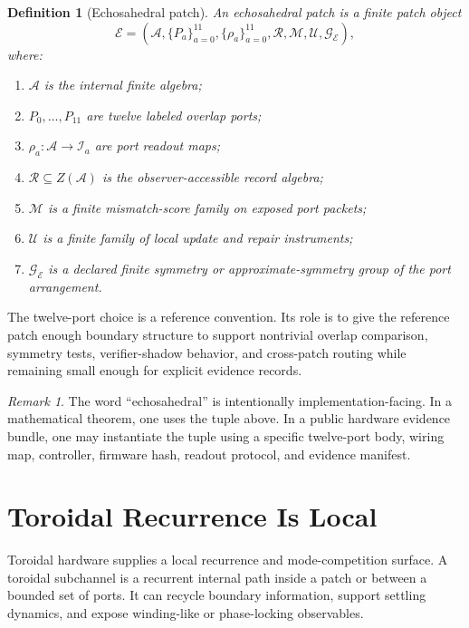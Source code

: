 \documentclass[11pt]{article}
\newtheorem{definition}[theorem]{Definition}
\theoremstyle{remark}
\newtheorem{remark}[theorem]{Remark}
\theoremstyle{plain}
\begin{document}
\begin{definition}[Echosahedral patch]
An echosahedral patch is a finite patch object
\[
\mathcal E=(\mathcal A,\{P_a\}_{a=0}^{11},\{\rho_a\}_{a=0}^{11},
\mathcal R,\mathcal M,\mathcal U,\mathcal G_{\mathcal E}),
\]
where:
\begin{enumerate}[leftmargin=2em]
\item \(\mathcal A\) is the internal finite algebra;
\item \(P_0,\ldots,P_{11}\) are twelve labeled overlap ports;
\item \(\rho_a:\mathcal A\to \mathcal I_a\) are port readout maps;
\item \(\mathcal R\subseteq Z(\mathcal A)\) is the observer-accessible record algebra;
\item \(\mathcal M\) is a finite mismatch-score family on exposed port packets;
\item \(\mathcal U\) is a finite family of local update and repair instruments;
\item \(\mathcal G_{\mathcal E}\) is a declared finite symmetry or approximate-symmetry group of
the port arrangement.
\end{enumerate}
\end{definition}

The twelve-port choice is a reference convention. Its role is to give the reference patch enough boundary
structure to support nontrivial overlap comparison, symmetry tests, verifier-shadow behavior, and
cross-patch routing while remaining small enough for explicit evidence records.

\begin{remark}
The word ``echosahedral'' is intentionally implementation-facing. In a mathematical theorem, one
uses the tuple above. In a public hardware evidence bundle, one may instantiate the tuple using a
specific twelve-port body, wiring map, controller, firmware hash, readout protocol, and evidence
manifest.
\end{remark}

\section{Toroidal Recurrence Is Local}

Toroidal hardware supplies a local recurrence and mode-competition surface. A toroidal subchannel
is a recurrent internal path inside a patch or between a bounded set of
ports. It can recycle boundary information, support settling dynamics, and expose winding-like
or phase-locking observables.
\end{document}
